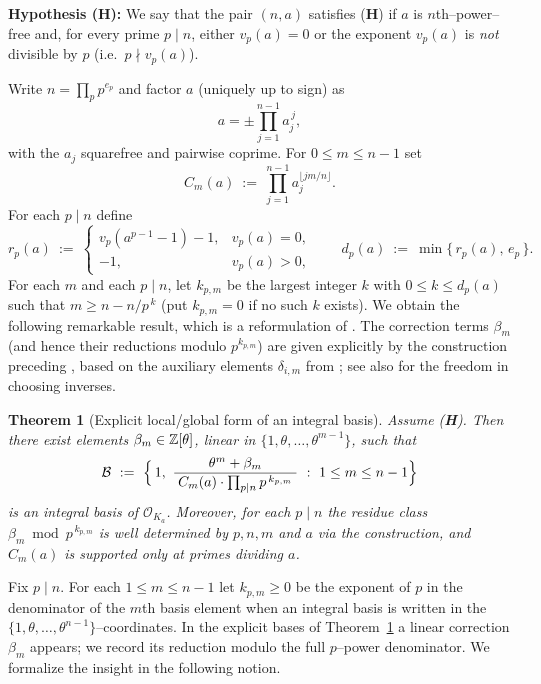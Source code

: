 \documentclass[12pt,a4paper,oneside]{amsart}
\newtheorem{theorem}{Theorem}[section]
\theoremstyle{definition}
\begin{document}
\medskip
\noindent
\textbf{Hypothesis (\textbf{H}):} We say that the pair $(n,a)$ satisfies (\textbf{H}) if $a$ is $n$th–power–free and, for every prime $p\mid n$, either $v_p(a)=0$ or the exponent $v_p(a)$ is \emph{not} divisible by $p$
(i.e.\ $p\nmid v_p(a)$).  

Write $n=\prod_{p}p^{e_p}$ and factor $a$ (uniquely up to sign) as
\[
a=\pm\prod_{j=1}^{n-1} a_j^{\,j},
\]
with the $a_j$ squarefree and pairwise coprime. For $0\le m\le n-1$ set
\[
C_m(a)\ :=\ \prod_{j=1}^{n-1} a_j^{\lfloor jm/n\rfloor}.
\]
For each $p\mid n$ define
\[
r_p(a)\ :=\
\begin{cases}
v_p(a^{p-1}-1)-1,& v_p(a)=0,\\[2pt]
-1,& v_p(a)>0,
\end{cases}
\qquad
d_p(a)\ :=\ \min\{\,r_p(a),\,e_p\,\}.
\]
For each $m$ and each $p\mid n$, let $k_{p,m}$ be the largest integer $k$ with $0\le k\le d_p(a)$
such that $m\ge n-n/p^{\,k}$ (put $k_{p,m}=0$ if no such $k$ exists). We obtain the following remarkable result, which is a reformulation of \cite[Theorem~1.6]{JKS21}.
The correction terms $\beta_m$ (and hence their reductions modulo $p^{k_{p,m}}$) are given explicitly by the construction preceding \cite[Theorem~1.6]{JKS21}, based on the auxiliary elements $\delta_{i,m}$ from \cite[Lemma~1.2]{JKS21}; see also \cite[Remark~1.7]{JKS21} for the freedom in choosing inverses.


\begin{theorem}[Explicit local/global form of an integral basis]\label{fact:JKS-form}
Assume (\textbf{H}). Then there exist elements
$\beta_m\in\Bbb Z[\theta]$, linear in $\{1,\theta,\dots,\theta^{m-1}\}$, such that
\[
\mathcal B\ :=\ \Bigl\{\,1,\ \frac{\theta^m+\beta_m}{\;C_m(a)\cdot\prod_{p\mid n}p^{\,k_{p,m}}\;}\ :\ 1\le m\le n-1\Bigr\}
\]
is an integral basis of $\mathcal O_{K_a}$.  Moreover, for each $p\mid n$ the residue class
$\beta_m\bmod p^{\,k_{p,m}}$ is well determined by $p,n,m$ and $a$ via the construction, and
$C_m(a)$ is supported only at primes dividing $a$. 
\end{theorem}

Fix $p\mid n$.  For each $1\le m\le n-1$ let $k_{p,m}\ge0$ be the exponent of $p$ in the denominator of the $m$th basis element when an integral basis is written in the
$\{1,\theta,\dots,\theta^{n-1}\}$–coordinates. In the explicit bases of Theorem~\ref{fact:JKS-form} a linear correction $\beta_m$ appears; we record its reduction modulo the full $p$–power denominator. We formalize the insight in the following notion.
\end{document}
